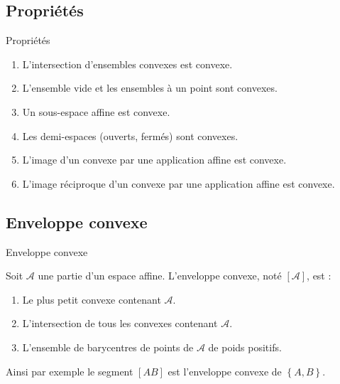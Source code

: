 \documentclass[
bigger]{m53beamer}
\begin{document}
\subsection{Propriétés}
\begin{frame}{Propriétés}
  \begin{enumerate}[<+(1)->]
    \item L'intersection d'ensembles convexes est convexe.
    \item L'ensemble vide et les ensembles à un point sont convexes.
    \item Un sous-espace affine est convexe.
    \item Les demi-espaces (ouverts, fermés) sont convexes.
    \item L'image d'un convexe par une application affine est convexe.
    \item L'image réciproque d'un convexe par une application affine est convexe.
  \end{enumerate}
\end{frame}

\subsection{Enveloppe convexe}
\begin{frame}{Enveloppe convexe}
  \begin{defprop}
    Soit $\mathcal{A}$ une partie d'un espace affine. L'enveloppe convexe, noté $[\mathcal{A}]$, est :
    \begin{enumerate}[<+(1)->]
      \item Le plus petit convexe contenant $\mathcal{A}$.
      \item L'intersection de tous les convexes contenant $\mathcal{A}$.
      \item L'ensemble de barycentres de points de $\mathcal{A}$ de poids positifs.
    \end{enumerate}
  \end{defprop}\pause
    Ainsi par exemple le segment $[AB]$ est l'enveloppe convexe de $\left\{A,B\right\}$.
\end{frame}
\end{document}
